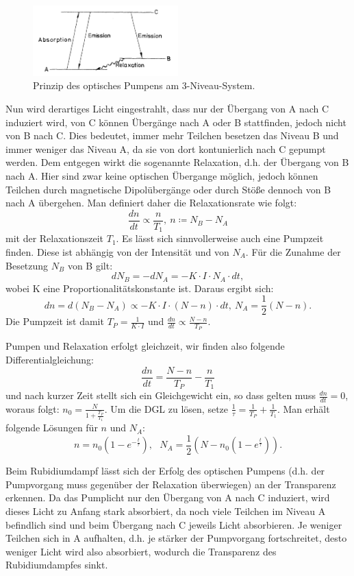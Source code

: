 \documentclass[bigchapter,colorback,accentcolor=tud4b,linedtoc,11pt]{tudreport}
\begin{document}
\begin{figure}[H] 
  \centering
     \includegraphics[width=0.5\textwidth]{img/Pumpen.jpg}
     \caption{Prinzip des optisches Pumpens am 3-Niveau-System.}
\end{figure}

Nun wird derartiges Licht eingestrahlt, dass nur der Übergang von A nach C induziert wird, von C können Übergänge nach A oder B stattfinden, jedoch nicht von B nach C. Dies bedeutet, immer mehr Teilchen besetzen das Niveau B und immer weniger das Niveau A, da sie von dort kontunierlich nach C gepumpt werden. Dem entgegen wirkt die sogenannte Relaxation, d.h. der Übergang von B nach A. Hier sind zwar keine optischen Übergange möglich, jedoch können Teilchen durch magnetische Dipolübergänge oder durch Stöße dennoch von B nach A übergehen. Man definiert daher die Relaxationsrate wie folgt: 
$$\frac{d n}{d t} \propto \frac{n}{T_1},~ n \coloneqq N_B-N_A$$
mit der Relaxationszeit $T_1$. Es lässt sich sinnvollerweise auch eine Pumpzeit finden. Diese ist abhängig von der Intensität und von $N_A$. Für die Zunahme der Besetzung $N_B$ von B gilt:
$$d N_B = - d N_A = -K \cdot I \cdot N_A \cdot d t,$$
wobei K eine Proportionalitätskonstante ist. Daraus ergibt sich:
$$d n = d (N_B-N_A) \propto -K \cdot I \cdot (N-n) \cdot d t,~ N_A = \frac{1}{2} (N-n).$$ 
Die Pumpzeit ist damit $T_P = \frac{1}{K \cdot I}$ und $\frac{d n}{d t} \propto \frac{N-n}{T_P}$.

Pumpen und Relaxation erfolgt gleichzeit, wir finden also folgende Differentialgleichung:
$$\frac{d n}{d t} = \frac{N-n}{T_P} - \frac{n}{T_1}$$
und nach kurzer Zeit stellt sich ein Gleichgewicht ein, so dass gelten muss $\frac{d n}{d t} = 0$, woraus folgt: $n_0 = \frac{N}{1+\frac{T_P}{T_1}}$. Um die DGL zu lösen, setze $\frac{1}{\tau} = \frac{1}{T_P} + \frac{1}{T_1}$. Man erhält folgende Lösungen für $n$ und $N_A$:
$$n = n_0 (1-e^{-\frac{t}{\tau}}),~~~ N_A = \frac{1}{2} (N-n_0 (1-e^{\frac{t}{\tau}})).$$

Beim Rubidiumdampf lässt sich der Erfolg des optischen Pumpens (d.h. der Pumpvorgang muss gegenüber der Relaxation überwiegen) an der Transparenz erkennen. Da das Pumplicht nur den Übergang von A nach C induziert, wird dieses Licht zu Anfang stark absorbiert, da noch viele Teilchen im Niveau A befindlich sind und beim Übergang nach C jeweils Licht absorbieren. Je weniger Teilchen sich in A aufhalten, d.h. je stärker der Pumpvorgang fortschreitet, desto weniger Licht wird also absorbiert, wodurch die Transparenz des Rubidiumdampfes sinkt. 
\end{document}
